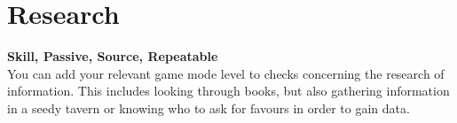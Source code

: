 \section{Research}\label{sec:research}
\textbf{Skill, Passive, Source, Repeatable}\\
You can add your relevant game mode level to checks concerning the research of information.
This includes looking through books, but also gathering information in a seedy tavern or knowing who to ask for favours in order to gain data.